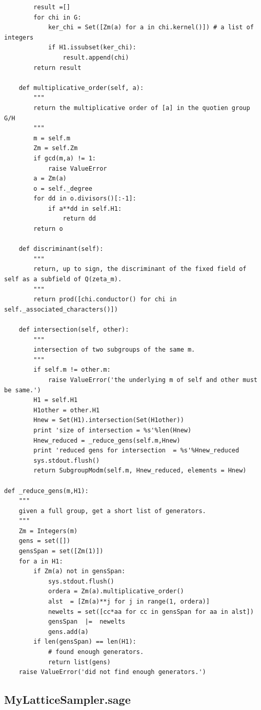 \documentclass[envcountsame]{llncs}
\begin{document}
\begin{verbatim}
        result =[]
        for chi in G:
            ker_chi = Set([Zm(a) for a in chi.kernel()]) # a list of integers
            if H1.issubset(ker_chi):
                result.append(chi)
        return result

    def multiplicative_order(self, a):
        """
        return the multiplicative order of [a] in the quotien group G/H
        """
        m = self.m
        Zm = self.Zm
        if gcd(m,a) != 1:
            raise ValueError
        a = Zm(a)
        o = self._degree
        for dd in o.divisors()[:-1]:
            if a**dd in self.H1:
                return dd
        return o

    def discriminant(self):
        """
        return, up to sign, the discriminant of the fixed field of self as a subfield of Q(zeta_m).
        """
        return prod([chi.conductor() for chi in self._associated_characters()])

    def intersection(self, other):
        """
        intersection of two subgroups of the same m.
        """
        if self.m != other.m:
            raise ValueError('the underlying m of self and other must be same.')
        H1 = self.H1
        H1other = other.H1
        Hnew = Set(H1).intersection(Set(H1other))
        print 'size of intersection = %s'%len(Hnew)
        Hnew_reduced = _reduce_gens(self.m,Hnew)
        print 'reduced gens for intersection  = %s'%Hnew_reduced
        sys.stdout.flush()
        return SubgroupModm(self.m, Hnew_reduced, elements = Hnew)

def _reduce_gens(m,H1):
    """
    given a full group, get a short list of generators.
    """
    Zm = Integers(m)
    gens = set([])
    gensSpan = set([Zm(1)])
    for a in H1:
        if Zm(a) not in gensSpan:
            sys.stdout.flush()
            ordera = Zm(a).multiplicative_order()
            alst  = [Zm(a)**j for j in range(1, ordera)]
            newelts = set([cc*aa for cc in gensSpan for aa in alst])
            gensSpan  |=  newelts
            gens.add(a)
        if len(gensSpan) == len(H1):
            # found enough generators.
            return list(gens)
    raise ValueError('did not find enough generators.')
\end{verbatim}

\subsection{MyLatticeSampler.sage}
\end{document}

